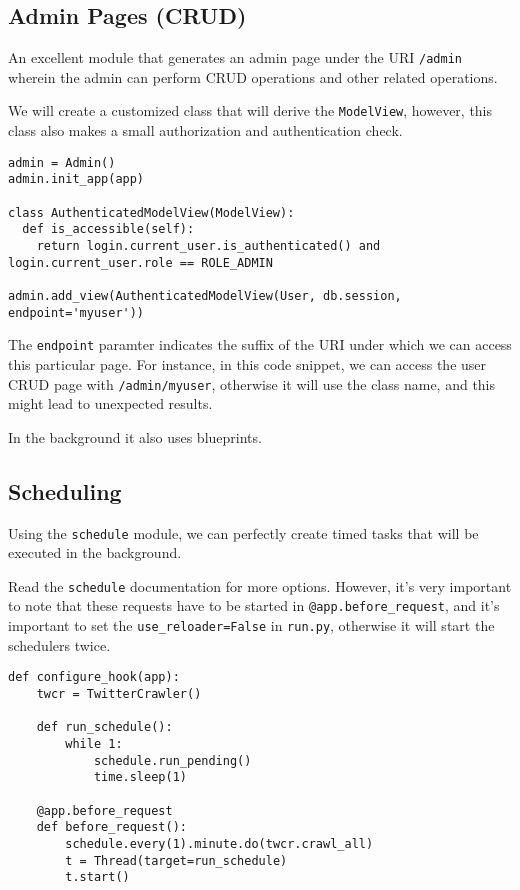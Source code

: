 \documentclass[../main/main.tex]{subfiles}
\begin{document}
\subsection{Admin Pages (CRUD)}

An excellent module that generates an admin page under the URI
\lstinline|/admin| wherein the admin can perform CRUD operations and other
related operations. 

We will create a customized class that will derive the \lstinline|ModelView|,
however, this class also makes a small authorization and authentication check. 

\begin{lstlisting}
admin = Admin()
admin.init_app(app)

class AuthenticatedModelView(ModelView):
  def is_accessible(self):
    return login.current_user.is_authenticated() and login.current_user.role == ROLE_ADMIN

admin.add_view(AuthenticatedModelView(User, db.session, endpoint='myuser'))

\end{lstlisting}

The \lstinline|endpoint| paramter indicates the suffix of the URI under which we
can access this particular page. For instance, in this code snippet, we can
access the user CRUD page with \lstinline|/admin/myuser|, otherwise it will use
the class name, and this might lead to unexpected results. 

In the background it also uses blueprints. 

\subsection{Scheduling}

Using the \lstinline|schedule| module, we can perfectly create timed tasks that
will be executed in the background. 

Read the \lstinline|schedule| documentation for more options. However, it's very
important to note that these requests have to be started in
\lstinline|@app.before_request|, and it's important to set the
\lstinline|use_reloader=False| in \lstinline|run.py|, otherwise it will start
the schedulers twice. 

\begin{lstlisting}
def configure_hook(app):
    twcr = TwitterCrawler()

    def run_schedule():
        while 1:
            schedule.run_pending()
            time.sleep(1)

    @app.before_request
    def before_request():
        schedule.every(1).minute.do(twcr.crawl_all)
        t = Thread(target=run_schedule)
        t.start()
\end{lstlisting}

% 
\end{document}
